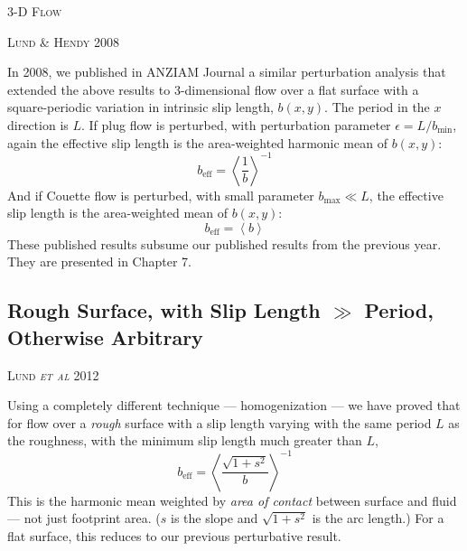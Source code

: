 \documentclass[12pt, a4paper, twoside, openright]{book}
\newcommand{\beff}{\ensuremath{b_{\mathrm{eff}}}}
\newcommand{\bmin}{\ensuremath{b_{\mathrm{min}}}}
\newcommand{\bmax}{\ensuremath{b_{\mathrm{max}}}}
\newcommand{\paper}[1]
         {\colorbox[gray]{0.8}{ \textsc{#1}}
         
         }
\begin{document}
\vspace{1em}
\colorbox[gray]{0.8}{ \textsc{3-D Flow} }

\paper{Lund \& Hendy 2008}

In 2008, we published in ANZIAM Journal \cite{LundHendy2008} a similar perturbation analysis that extended the above results to 3-dimensional flow over a flat surface with a square-periodic variation in intrinsic slip length, $b(x,y)$.  The period in the $x$ direction is $L$. If plug flow is perturbed, with perturbation parameter $\epsilon = L / \bmin$, again the effective slip length is the area-weighted harmonic mean of $b(x,y)$:
\begin{equation}
\beff = \left< \frac{1}{b} \right>^{-1}
\end{equation}
And if Couette flow is perturbed, with small parameter $\bmax \ll L$, the effective slip length is the area-weighted mean of $b(x,y)$:
\begin{equation}
\beff = \left< b \right>
\end{equation}
These published results subsume our published results from the previous year.
They are presented in Chapter 7.


\subsection{Rough Surface, with Slip Length $ \gg$ Period,\\ Otherwise Arbitrary}

\paper{Lund \emph{et al} 2012}
Using a completely different technique --- homogenization --- we have proved that
for flow over a \emph{rough} surface with a slip length varying with the same period $L$ as the roughness, with the minimum slip length much greater than $L$,
\begin{equation}
\beff = \left< \frac{\sqrt{1 + s^2}}{b} \right>^{-1}
\end{equation}
This is the harmonic mean weighted by \emph{area of contact} between surface and fluid --- not just footprint area.  ($s$ is the slope and $\sqrt{1+s^2}$ is the arc length.)  For a flat surface, this reduces to our previous perturbative result.
\end{document}
